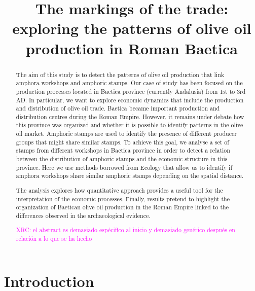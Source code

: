 \documentclass[review]{elsarticle}
\newcommand{\memo}[2]{\textcolor{#1}{#2}}
\newcommand{\xavi}[1]{\memo{magenta}{XRC: #1\\}}
\begin{document}
\title{The markings of the trade: exploring the patterns of olive oil production in Roman Baetica}


\begin{frontmatter}

\begin{abstract}

The aim of this study is to detect the patterns of olive oil production that link amphora workshops and amphoric stamps. Our case of study has been focused on the production processes located in Baetica province (currently Andalusia) from 1st to 3rd AD. In particular, we want to explore economic dynamics that include the production and distribution of olive oil trade. 
Baetica became important production and distribution centres during the Roman Empire. However, it remains under debate how this province was organized and whether it is possible to identify patterns in the olive oil market. Amphoric stamps are used to identify the presence of different producer groups that might share similar stamps. To achieve this goal, we analyse a set of stamps from different workshops in Baetica province in order to detect a relation between the distribution of amphoric stamps and the economic structure in this province. Here we use methods borrowed from Ecology that allow us to identify if amphora workshops share similar amphoric stamps depending on the spatial distance. 

The analysis explores how quantitative approach provides a useful tool for the interpretation of the economic processes. Finally, results pretend to highlight the organization of Baetican olive oil production in the Roman Empire linked to the differences observed in the archaeological evidence.

\xavi{el abstract es demasiado espécifico al inicio y demasiado genérico después en relación a lo que se ha hecho}

\end{abstract}


\end{frontmatter}

\section{Introduction}
\end{document}

